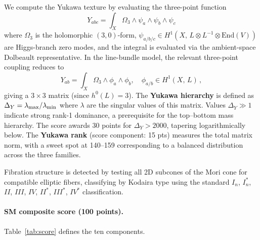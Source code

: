 \documentclass[11pt,a4paper]{article}
\begin{document}
We compute the Yukawa texture by evaluating the three-point
function
\begin{equation}
  Y_{abc} = \int_X \Omega_3 \wedge \psi_a \wedge \psi_b \wedge \psi_c
  \label{eq:yukawa}
\end{equation}
where $\Omega_3$ is the holomorphic $(3,0)$-form,
$\psi_{a/b/c} \in H^1(X,\, L\otimes L^{-1}\otimes \text{End}(V))$
are Higgs-branch zero modes, and the integral is evaluated via the
ambient-space Dolbeault representative.
In the line-bundle model, the relevant three-point coupling
reduces to
\begin{equation}
  Y_{ab} = \int_X \Omega_3 \wedge \phi_a \wedge \phi_b,
  \quad \phi_{a/b} \in H^1(X,\,L)\,,
  \label{eq:yukawa2}
\end{equation}
giving a $3\times 3$ matrix (since $h^0(L)=3$).
The \textbf{Yukawa hierarchy} is defined as
$\Delta_Y = \lambda_{\rm max}/\lambda_{\rm min}$
where $\lambda$ are the singular values of this matrix.
Values $\Delta_Y \gg 1$ indicate strong rank-1 dominance, a
prerequisite for the top--bottom mass hierarchy.
The score awards 30 points for $\Delta_Y > 2000$, tapering
logarithmically below.
The \textbf{Yukawa rank} (score component: 15 pts) measures the
total matrix norm, with a sweet spot at 140--159 corresponding
to a balanced distribution across the three families.

Fibration structure is detected by testing all 2D subcones of
the Mori cone for compatible elliptic fibers, classifying by
Kodaira type using the standard $I_n$, $I_n^*$, $II$, $III$, $IV$,
$II^*$, $III^*$, $IV^*$ classification.

\paragraph{SM composite score (100 points).}
Table~\ref{tab:score} defines the ten components.
\end{document}
